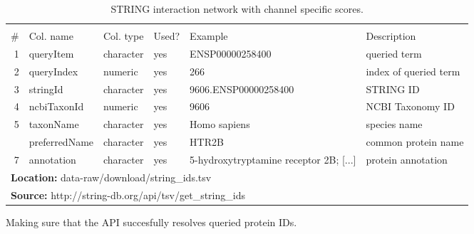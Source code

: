 \begin{table}[H]

\caption{\label{tab:string_ids}STRING interaction network with channel specific scores.}
\begin{tabular}[t]{rlllll}
\toprule
\multicolumn{6}{c}{\bgroup\fontsize{12}{14}\selectfont \cellcolor[HTML]{EEEEEE}{\ttfamily{\textbf{string\_ids}}}\egroup{}} \\
\cmidrule(l{3pt}r{3pt}){1-6}
\# & Col. name & Col. type & Used? & Example & Description\\
\midrule
\rowcolor{gray!6}  1 & queryItem & character & yes & ENSP00000258400 & queried term\\
2 & queryIndex & numeric & yes & 266 & index of queried term\\
\rowcolor{gray!6}  3 & stringId & character & yes & 9606.ENSP00000258400 & STRING ID\\
4 & ncbiTaxonId & numeric & yes & 9606 & NCBI Taxonomy ID\\
\rowcolor{gray!6}  5 & taxonName & character & yes & Homo sapiens & species name\\
\addlinespace
6 & preferredName & character & yes & HTR2B & common protein name\\
\rowcolor{gray!6}  7 & annotation & character & yes & 5-hydroxytryptamine receptor 2B; [...] & protein annotation\\
\bottomrule
\multicolumn{6}{l}{\textbf{Location: } data-raw/download/string\_ids.tsv}\\
\multicolumn{6}{l}{\textbf{Source: } http://string-db.org/api/tsv/get\_string\_ids}\\
\end{tabular}
\end{table}

Making sure that the API succesfully resolves queried protein IDs.

